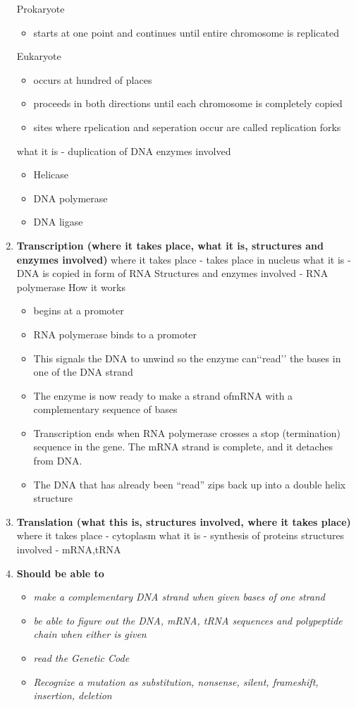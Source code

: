\documentclass[9pt]{article}
\begin{document}
\begin{enumerate}
  Prokaryote
  \begin{itemize}
    \item starts at one point and continues until entire chromosome is replicated
  \end{itemize}
  Eukaryote
  \begin{itemize}
    \item occurs at hundred of places
    \item proceeds in both directions until each chromosome is completely copied
    \item sites where rpelication and seperation occur are called replication forks
  \end{itemize}
  what it is - duplication of DNA
  enzymes involved
  \begin{itemize}
    \item Helicase
    \item DNA polymerase
    \item DNA ligase
  \end{itemize}
  \item {\bf Transcription (where it takes place, what it is, structures and enzymes involved)}
  where it takes place - takes place in nucleus
  what it is - DNA is copied in form of RNA
  Structures and enzymes involved - RNA polymerase
  How it works
  \begin{itemize}
    \item begins at a promoter
    \item RNA polymerase binds to a promoter
    \item  This signals the DNA to unwind so the enzyme can‘‘read’’ the bases in one of the DNA strand
    \item The enzyme is now ready to make a strand ofmRNA with a complementary sequence of bases
    \item Transcription ends when RNA polymerase crosses a stop (termination) sequence in the gene. The mRNA strand is complete, and it detaches from DNA.
    \item  The DNA that has already been “read” zips back up into a double helix structure
  \end{itemize}
  \item {\bf Translation (what this is, structures involved, where it takes place)}
  where it takes place - cytoplasm
  what it is  - synthesis of proteins
  structures involved - mRNA,tRNA
  \item {\bf Should be able to}
    \begin{itemize}
      \item {\em make a complementary DNA strand when given bases of one strand}
      \item {\em be able to figure out the DNA, mRNA, tRNA sequences and polypeptide chain when either is given}
      \item {\em read the Genetic Code}
      \item {\em Recognize a mutation as substitution, nonsense, silent, frameshift, insertion, deletion}
    \end{itemize}
\end{enumerate}
\end{document}
